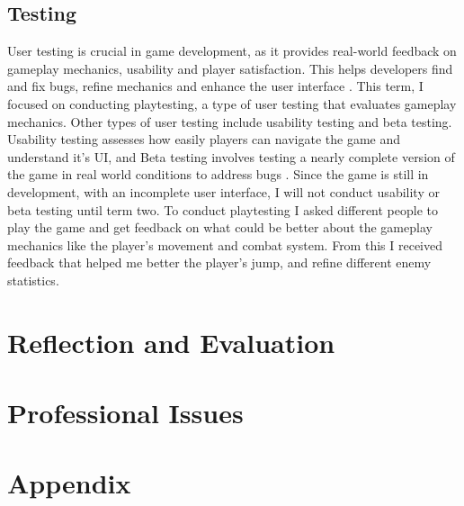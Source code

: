 \documentclass[]{final_report}
\begin{document}
\section{Testing}
User testing is crucial in game development, as it provides real-world feedback on gameplay mechanics, usability and player satisfaction. This helps developers find and fix bugs, refine mechanics and enhance the user interface \cite{flashjungle_2022}. This term, I focused on conducting playtesting, a type of user testing that evaluates gameplay mechanics. Other types of user testing include usability testing and beta testing. Usability testing assesses how easily players can navigate the game and understand it's UI, and Beta testing involves testing a nearly complete version of the game in real world conditions to address bugs \cite{flashjungle_2022}. Since the game is still in development, with an incomplete user interface, I will not conduct usability or beta testing until term two. To conduct playtesting I asked different people to play the game and get feedback on what could be better about the gameplay mechanics like the player's movement and combat system. From this I received feedback that helped me better the player's jump, and refine different enemy statistics.
\chapter{Reflection and Evaluation}

\chapter{Professional Issues}

\appendix
\chapter{Appendix}
\end{document}
